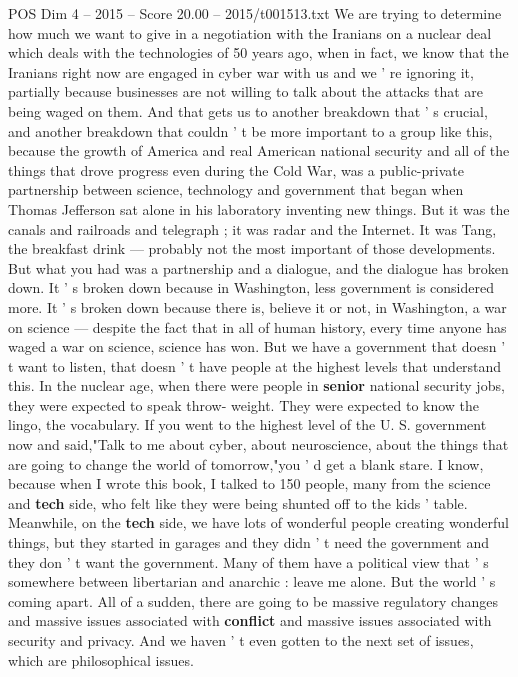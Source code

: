 \begin{textsample}{POS Dim 4 – 2015 – Score 20.00 – 2015/t001513.txt}
We are trying to determine how much we want to give in a negotiation with the Iranians on a nuclear deal which deals with the technologies of 50 years ago, when in fact, we know that the Iranians right now are engaged in cyber war with us and we ' re ignoring it, partially because businesses are not willing to talk about the attacks that are being waged on them.
And that gets us to another breakdown that ' s crucial, and another breakdown that couldn ' t be more important to a group like this, because the growth of America and real American national security and all of the things that drove progress even during the Cold War, was a public-private partnership between science, technology and government that began when Thomas Jefferson sat alone in his laboratory inventing new things.
But it was the canals and railroads and telegraph ; it was radar and the Internet.
It was Tang, the breakfast drink — probably not the most important of those developments.
But what you had was a partnership and a dialogue, and the dialogue has broken down.
It ' s broken down because in Washington, less government is considered more.
It ' s broken down because there is, believe it or not, in Washington, a war on science — despite the fact that in all of human history, every time anyone has waged a war on science, science has won.
But we have a government that doesn ' t want to listen, that doesn ' t have people at the highest levels that understand this.
In the nuclear age, when there were people in \textbf{senior} national security jobs, they were expected to speak throw- weight.
They were expected to know the lingo, the vocabulary.
If you went to the highest level of the U.
S. government now and said,"Talk to me about cyber, about neuroscience, about the things that are going to change the world of tomorrow,"you ' d get a blank stare.
I know, because when I wrote this book, I talked to 150 people, many from the science and \textbf{tech} side, who felt like they were being shunted off to the kids ' table.
Meanwhile, on the \textbf{tech} side, we have lots of wonderful people creating wonderful things, but they started in garages and they didn ' t need the government and they don ' t want the government.
Many of them have a political view that ' s somewhere between libertarian and anarchic : leave me alone.
But the world ' s coming apart.
All of a sudden, there are going to be massive regulatory changes and massive issues associated with \textbf{conflict} and massive issues associated with security and privacy.
And we haven ' t even gotten to the next set of issues, which are philosophical issues.

\end{textsample}
